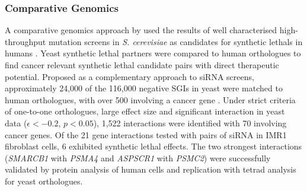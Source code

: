 \subsubsection{Comparative Genomics}

A comparative \gls{genomics} approach by \citet{Deshpande2013} used the results of well characterised high-throughput mutation screens in \textit{S. cerevisiae} as candidates for \glspl{synthetic lethal} in humans \citep{Baryshnikova2010a, Costanzo2010, Costanzo2011, Tong2001, Tong2004}. Yeast \gls{synthetic lethal} partners were compared to human orthologues to find cancer relevant \gls{synthetic lethal} candidate pairs with direct therapeutic potential. Proposed as a complementary approach to siRNA screens, approximately 24,000 of the 116,000 negative \glspl{SGI} in yeast \citep{Costanzo2011} were matched to human orthologues, with over 500 involving a cancer gene \citep{Futreal2004}. Under strict criteria of one-to-one orthologues, large effect size and significant interaction in yeast data ($\epsilon < -0.2$, $p < 0.05$), 1,522 interactions were identified with 70 involving cancer genes. Of the 21 gene interactions tested with pairs of siRNA in IMR1 fibroblast cells, 6 exhibited \gls{synthetic lethal} effects. The two strongest interactions (\textit{SMARCB1} with \textit{PSMA4} and \textit{ASPSCR1} with \textit{PSMC2}) were successfully validated by protein analysis of human cells and replication with tetrad analysis for yeast orthologues.

